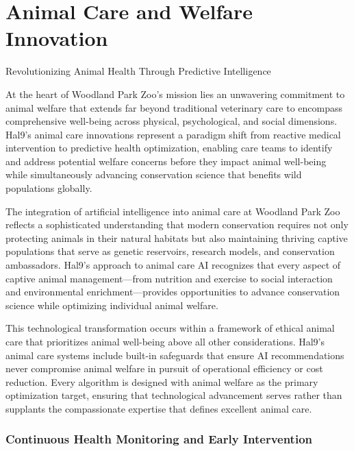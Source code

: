 \documentclass[
  Letterpaper,
]{scrbook}
\begin{document}

\chapter{Animal Care and Welfare
Innovation}\label{animal-care-and-welfare-innovation}

Revolutionizing Animal Health Through Predictive Intelligence

\hfill\break

At the heart of Woodland Park Zoo's mission lies an unwavering
commitment to animal welfare that extends far beyond traditional
veterinary care to encompass comprehensive well-being across physical,
psychological, and social dimensions. Hal9's animal care innovations
represent a paradigm shift from reactive medical intervention to
predictive health optimization, enabling care teams to identify and
address potential welfare concerns before they impact animal well-being
while simultaneously advancing conservation science that benefits wild
populations globally.

The integration of artificial intelligence into animal care at Woodland
Park Zoo reflects a sophisticated understanding that modern conservation
requires not only protecting animals in their natural habitats but also
maintaining thriving captive populations that serve as genetic
reservoirs, research models, and conservation ambassadors. Hal9's
approach to animal care AI recognizes that every aspect of captive
animal management---from nutrition and exercise to social interaction
and environmental enrichment---provides opportunities to advance
conservation science while optimizing individual animal welfare.

This technological transformation occurs within a framework of ethical
animal care that prioritizes animal well-being above all other
considerations. Hal9's animal care systems include built-in safeguards
that ensure AI recommendations never compromise animal welfare in
pursuit of operational efficiency or cost reduction. Every algorithm is
designed with animal welfare as the primary optimization target,
ensuring that technological advancement serves rather than supplants the
compassionate expertise that defines excellent animal care.

\subsection{Continuous Health Monitoring and Early
Intervention}\label{continuous-health-monitoring-and-early-intervention}
\end{document}
